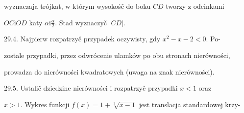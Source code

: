 \documentclass[a4paper,12pt]{article}
\begin{document}
wyznaczaja trójkat, $\mathrm{w}$ którym wysokośč do boku $CD$ tworzy $\mathrm{z}$ odcinkami

$OC\mathrm{i}OD$ katy $\displaystyle \alpha \mathrm{i}\frac{\alpha}{2}$. Stad wyznaczyč $|CD|.$

29.4. Najpierw rozpatrzyč przypadek oczywisty, gdy $x^{2}-x-2<0$. Po-

zostale przypadki, przez odwrócenie ulamków po obu stronach nierówności,

prowadza do nierówności kwadratowych (uwaga na znak nierówności).

29.5. Ustalič dziedzine nierówności $\mathrm{i}$ rozpatrzyč przypadki $x< 1$ oraz

$x>1$. Wykres funkcji $f(x)=1+\sqrt[3]{x-1}$ jest translacja standardowej krzy-
\end{document}
